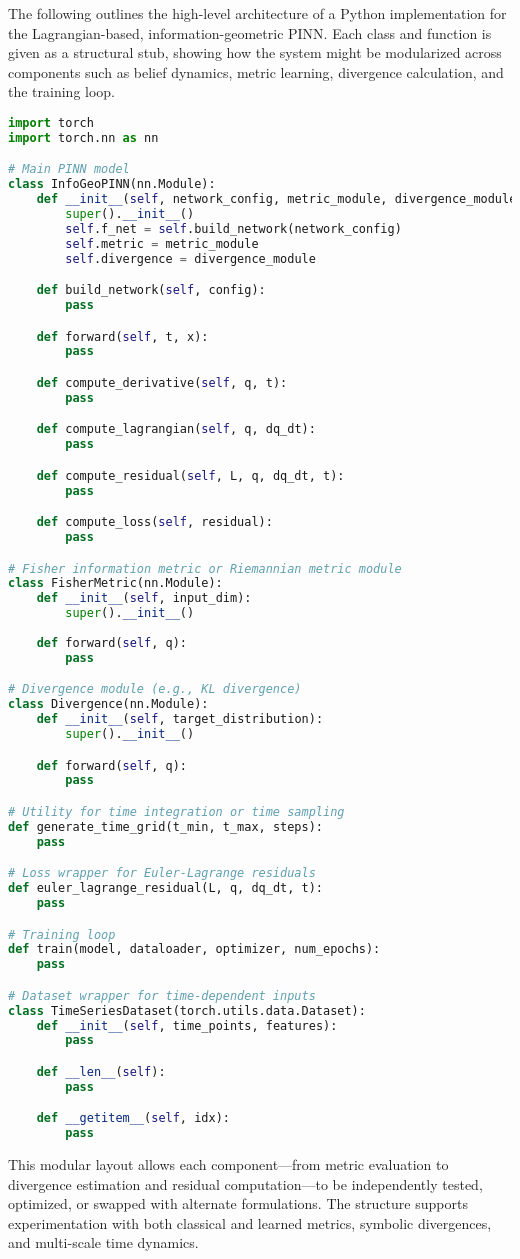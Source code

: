 The following outlines the high-level architecture of a Python implementation for the Lagrangian-based, information-geometric PINN. Each class and function is given as a structural stub, showing how the system might be modularized across components such as belief dynamics, metric learning, divergence calculation, and the training loop.

\begin{lstlisting}[language=Python]
import torch
import torch.nn as nn

# Main PINN model
class InfoGeoPINN(nn.Module):
    def __init__(self, network_config, metric_module, divergence_module):
        super().__init__()
        self.f_net = self.build_network(network_config)
        self.metric = metric_module
        self.divergence = divergence_module

    def build_network(self, config):
        pass

    def forward(self, t, x):
        pass

    def compute_derivative(self, q, t):
        pass

    def compute_lagrangian(self, q, dq_dt):
        pass

    def compute_residual(self, L, q, dq_dt, t):
        pass

    def compute_loss(self, residual):
        pass

# Fisher information metric or Riemannian metric module
class FisherMetric(nn.Module):
    def __init__(self, input_dim):
        super().__init__()
    
    def forward(self, q):
        pass

# Divergence module (e.g., KL divergence)
class Divergence(nn.Module):
    def __init__(self, target_distribution):
        super().__init__()

    def forward(self, q):
        pass

# Utility for time integration or time sampling
def generate_time_grid(t_min, t_max, steps):
    pass

# Loss wrapper for Euler-Lagrange residuals
def euler_lagrange_residual(L, q, dq_dt, t):
    pass

# Training loop
def train(model, dataloader, optimizer, num_epochs):
    pass

# Dataset wrapper for time-dependent inputs
class TimeSeriesDataset(torch.utils.data.Dataset):
    def __init__(self, time_points, features):
        pass

    def __len__(self):
        pass

    def __getitem__(self, idx):
        pass
\end{lstlisting}

This modular layout allows each component---from metric evaluation to divergence estimation and residual computation---to be independently tested, optimized, or swapped with alternate formulations. The structure supports experimentation with both classical and learned metrics, symbolic divergences, and multi-scale time dynamics.


